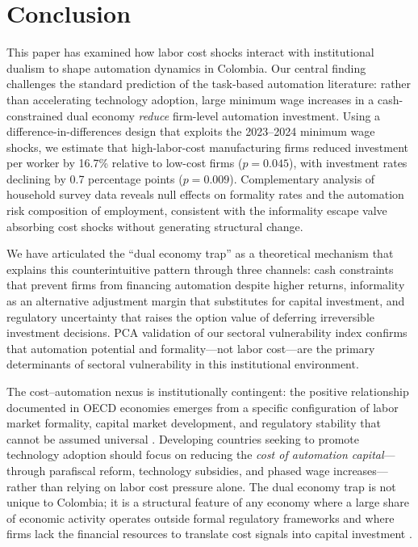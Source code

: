 \documentclass[5p,times,authoryear]{elsarticle}
\begin{document}
\section{Conclusion}
\label{sec:conclusion}

This paper has examined how labor cost shocks interact with institutional dualism to shape automation dynamics in Colombia. Our central finding challenges the standard prediction of the task-based automation literature: rather than accelerating technology adoption, large minimum wage increases in a cash-constrained dual economy \emph{reduce} firm-level automation investment. Using a difference-in-differences design that exploits the 2023--2024 minimum wage shocks, we estimate that high-labor-cost manufacturing firms reduced investment per worker by 16.7\% relative to low-cost firms ($p = 0.045$), with investment rates declining by 0.7 percentage points ($p = 0.009$). Complementary analysis of household survey data reveals null effects on formality rates and the automation risk composition of employment, consistent with the informality escape valve absorbing cost shocks without generating structural change.

We have articulated the ``dual economy trap'' as a theoretical mechanism that explains this counterintuitive pattern through three channels: cash constraints that prevent firms from financing automation despite higher returns, informality as an alternative adjustment margin that substitutes for capital investment, and regulatory uncertainty that raises the option value of deferring irreversible investment decisions. PCA validation of our sectoral vulnerability index confirms that automation potential and formality---not labor cost---are the primary determinants of sectoral vulnerability in this institutional environment.

The cost--automation nexus is institutionally contingent: the positive relationship documented in OECD economies emerges from a specific configuration of labor market formality, capital market development, and regulatory stability that cannot be assumed universal \citep{kuznets1973modern, lewis1954economic}. Developing countries seeking to promote technology adoption should focus on reducing the \emph{cost of automation capital}---through parafiscal reform, technology subsidies, and phased wage increases---rather than relying on labor cost pressure alone. The dual economy trap is not unique to Colombia; it is a structural feature of any economy where a large share of economic activity operates outside formal regulatory frameworks and where firms lack the financial resources to translate cost signals into capital investment \citep{worldbank2019wdr, ilo2024outlook}.
\end{document}
